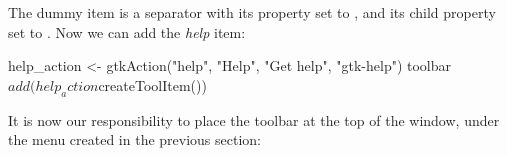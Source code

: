 % 
The dummy item is a separator with its  property set to
, and its  child property set to
. Now we can add the \textit{help} item:
\begin{Schunk}
\begin{Sinput}
 help_action <- gtkAction("help", "Help", "Get help", "gtk-help")
 toolbar$add(help_action$createToolItem())
\end{Sinput}
\end{Schunk}

It is now our responsibility to place the toolbar at the top of the
window, under the menu created in the previous section:
\begin{Schunk}
\end{Schunk}

